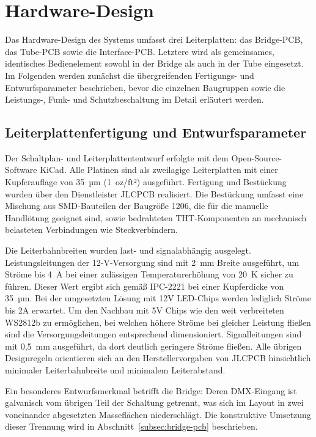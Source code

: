 \section{Hardware-Design}
\label{sec:hardware-design}

Das Hardware-Design des Systems umfasst drei Leiterplatten:
das Bridge-PCB, das Tube-PCB sowie die Interface-PCB.
Letztere wird als gemeinsames, identisches Bedienelement sowohl
in der Bridge als auch in der Tube eingesetzt. Im Folgenden
werden zunächst die übergreifenden Fertigungs- und
Entwurfsparameter beschrieben, bevor die einzelnen Baugruppen
sowie die Leistungs-, Funk- und Schutzbeschaltung im Detail
erläutert werden.

\subsection{Leiterplattenfertigung und Entwurfsparameter}
\label{subsec:pcb-fertigung}

Der Schaltplan- und Leiterplattententwurf erfolgte mit dem
Open-Source-Software KiCad. Alle Platinen sind als
zweilagige Leiterplatten mit einer Kupferauflage von 35~µm
(1~oz/ft²) ausgeführt. Fertigung und Bestückung wurden über
den Dienstleister JLCPCB realisiert. Die Bestückung umfasst
eine Mischung aus SMD-Bauteilen der Baugröße 1206, die für
die manuelle Handlötung geeignet sind, sowie bedrahteten
THT-Komponenten an mechanisch belasteten Verbindungen wie
Steckverbindern.

Die Leiterbahnbreiten wurden last- und signalabhängig
ausgelegt. Leistungsleitungen der 12-V-Versorgung sind mit
2~mm Breite ausgeführt, um Ströme bis 4~A bei einer
zulässigen Temperaturerhöhung von 20~K sicher zu führen.
Dieser Wert ergibt sich gemäß IPC-2221 bei einer Kupferdicke
von 35~µm. Bei der umgesetzten Lösung mit 12V LED-Chips werden 
lediglich Ströme bis 2A erwartet. Um den Nachbau mit 5V Chips 
wie den weit verbreiteten WS2812b zu ermöglichen, bei welchen 
höhere Ströme bei gleicher Leistung fließen sind die 
Versorgungsleitungen entsprechend dimensioniert.
Signalleitungen sind mit 0,5~mm ausgeführt, da
dort deutlich geringere Ströme fließen. Alle übrigen
Designregeln orientieren sich an den Herstellervorgaben von
JLCPCB hinsichtlich minimaler Leiterbahnbreite und
minimalem Leiterabstand.

Ein besonderes Entwurfsmerkmal betrifft die Bridge: Deren DMX-Eingang
ist galvanisch vom übrigen Teil der Schaltung getrennt, was sich im
Layout in zwei voneinander abgesetzten Masseflächen niederschlägt. Die
konstruktive Umsetzung dieser Trennung wird in
Abschnitt~\ref{subsec:bridge-pcb} beschrieben.


